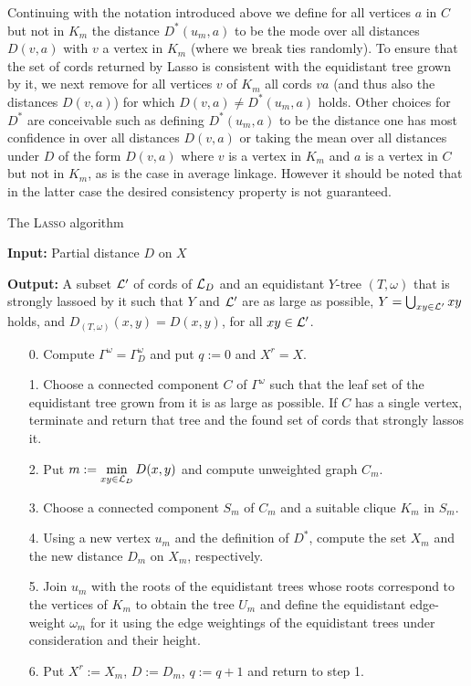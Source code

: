 Continuing with the notation introduced above we define for all vertices $a$
in $C$ but not in $K_m$ the distance $D^*(u_m,a)$ to be the mode over all
distances $D(v,a)$ with $v$ a vertex in $K_m$ (where we break ties randomly).
To ensure that the set of cords returned by {\sc Lasso} is consistent with the
equidistant tree grown by it, we next remove for all vertices $v$ of $K_m$ all
cords $va$ (and thus also the distances $D(v,a)$) for which
$D(v,a)\not=D^*(u_m,a)$ holds.  Other choices for $D^*$ are conceivable such
as defining $D^*(u_m,a)$ to be the distance one has most confidence in over
all distances $D(v,a)$ or taking the mean over all distances under $D$ of the
form $D(v,a)$ where $v$ is a vertex in $K_m$ and $a$ is a vertex in $C$ but
not in $K_m$, as is the case in average linkage. However it should be noted
that in the latter case the desired consistency property is not guaranteed.

\begin{algorithm}
  \caption{The \textsc{Lasso} algorithm}
  \textbf{Input:} Partial distance $D$ on $X$ 

  \textbf{Output:} A subset ${\mathcal L}'$ of cords of ${\mathcal L}_D$ and an equidistant
  $Y$-tree $(T,\omega)$ that is strongly lassoed by it such that $Y$ and
  ${\mathcal L}'$ are as large as possible, $Y=\bigcup_{xy\in {\mathcal L}'}xy$ holds, and
  $D_{(T,\omega)}(x,y) = D(x,y)$, for all $xy \in {\mathcal L}'$.

  \begin{itemize}
  \item[0.] Compute $\Gamma^{\omega} =\Gamma^{\omega}_D$ and put $q := 0$
and $X^r=X$.
  \item[1.] Choose a connected component $C$ of  $\Gamma^{\omega}$ 
such that the leaf set of the equidistant tree grown from it is as 
large as possible.  If $C$ has a single vertex, terminate 
and return that tree and the found set of cords that strongly lassos it.
  \item[2.] Put $\displaystyle m := \min_{xy \in {\mathcal L}_D} D(x,y)$
and compute unweighted graph $C_m$. 
  \item[3.] Choose a connected component $S_m$ of $C_m$ and a suitable
clique $K_m$ in $S_m$.
\item[4.] Using a new vertex $u_m$ and the definition of $D^*$,
compute the set $X_m$ and the new distance $D_m$ on $X_m$, respectively. 
  \item[5.] Join $u_m$ with the roots of the equidistant trees 
whose roots correspond to the vertices of $K_m$ to obtain the tree $U_m$
and define the equidistant edge-weight $\omega_m$ for it using the edge
weightings of the equidistant trees under consideration and their 
height. 
  \item[6.] 
    Put $X^r:=X_m$, $D:=D_m$, $q := q+1$ and return to
    step 1.
  \end{itemize}
\end{algorithm}

